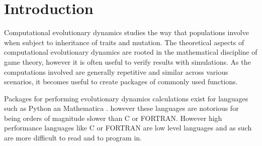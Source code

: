 \section{Introduction}

Computational evolutionary dynamics studies the way that populations involve when subject to inheritance of traits and mutation.
The theoretical aspects of computational evolutionary dynamics are rooted in the mathematical discipline of game theory, however it is often useful to verify results with simulations.
As the computations involved are generally repetitive and similar across various scenarios, it becomes useful to create packages of commonly used functions.

Packages for performing evolutionary dynamics calculations exist for languages such as Python \cite{pyevodyn} an Mathematica \cite{dynamo}. however these languages are notorious for being orders of magnitude slower than C or FORTRAN.
However high performance languages like C or FORTRAN are low level languages and as such are more difficult to read and to program in.
